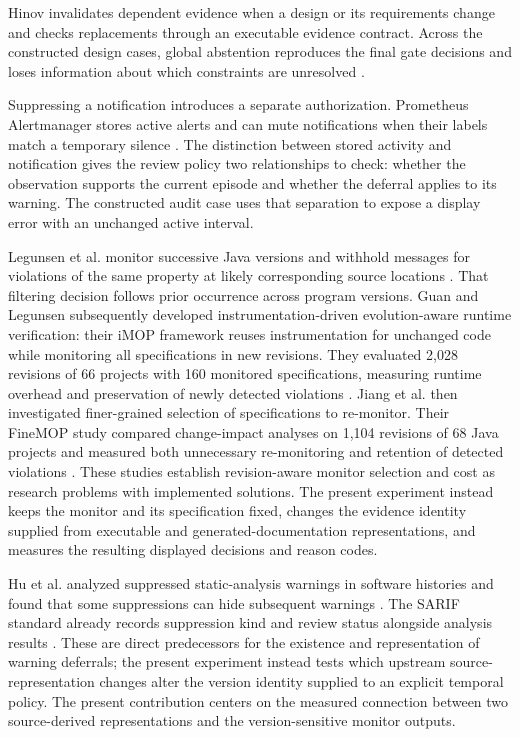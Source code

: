 \documentclass[preprint,11pt]{elsarticle}
\begin{document}
Hinov invalidates dependent evidence when a design or its requirements change and checks replacements through an executable evidence contract. Across the constructed design cases, global abstention reproduces the final gate decisions and loses information about which constraints are unresolved \cite{hinov2026assurance}.

Suppressing a notification introduces a separate authorization. Prometheus Alertmanager stores active alerts and can mute notifications when their labels match a temporary silence \cite{prometheus2026alertmanager}. The distinction between stored activity and notification gives the review policy two relationships to check: whether the observation supports the current episode and whether the deferral applies to its warning. The constructed audit case uses that separation to expose a display error with an unchanged active interval.

Legunsen et al. monitor successive Java versions and withhold messages for violations of the same property at likely corresponding source locations \cite{legunsen2019evolution}. That filtering decision follows prior occurrence across program versions. Guan and Legunsen subsequently developed instrumentation-driven evolution-aware runtime verification: their iMOP framework reuses instrumentation for unchanged code while monitoring all specifications in new revisions. They evaluated 2,028 revisions of 66 projects with 160 monitored specifications, measuring runtime overhead and preservation of newly detected violations \cite{guan2025imop}. Jiang et al. then investigated finer-grained selection of specifications to re-monitor. Their FineMOP study compared change-impact analyses on 1,104 revisions of 68 Java projects and measured both unnecessary re-monitoring and retention of detected violations \cite{jiang2026finemop}. These studies establish revision-aware monitor selection and cost as research problems with implemented solutions. The present experiment instead keeps the monitor and its specification fixed, changes the evidence identity supplied from executable and generated-documentation representations, and measures the resulting displayed decisions and reason codes.

Hu et al. analyzed suppressed static-analysis warnings in software histories and found that some suppressions can hide subsequent warnings \cite{hu2025suppressed}. The SARIF standard already records suppression kind and review status alongside analysis results \cite{oasis2019sarif}. These are direct predecessors for the existence and representation of warning deferrals; the present experiment instead tests which upstream source-representation changes alter the version identity supplied to an explicit temporal policy. The present contribution centers on the measured connection between two source-derived representations and the version-sensitive monitor outputs.
\end{document}
